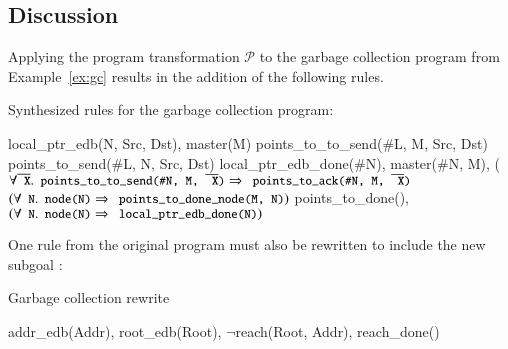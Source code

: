 

\subsection{Discussion}
Applying the program transformation $\mathcal{P}$ to the garbage collection program from Example~\ref{ex:gc} results in the addition of the following rules.

\begin{example}
Synthesized rules for the garbage collection program:

\begin{Drules}
        {local_ptr_edb(N, Src, Dst), master(M)}
        {points_to_to_send(#L, M, Src, Dst)}
        {points_to_send(#L, N, Src, Dst)}
        {local_ptr_edb_done(#N), master(#N, M), (\(\forall \od{X}.\dedalus{points_to_to_send(#N, M, \od{X})} \Rightarrow \dedalus{points_to_ack(#N, M, \od{X})}\)}
        {\(\left(\forall \dedalus{N}.\dedalus{node(N)} \Rightarrow \dedalus{points_to_done_node(M, N)}\right)\)}
        {points_to_done(), \(\left(\forall \dedalus{N}.\dedalus{node(N)} \Rightarrow \dedalus{local_ptr_edb_done(N)}\right)\)}
\end{Drules}
\end{example}

One rule from the original program must also be rewritten to include the
new subgoal :

\begin{example}
Garbage collection rewrite

\begin{Drules}
        {addr_edb(Addr), root_edb(Root), $\lnot$reach(Root, Addr), reach_done()}
\end{Drules}
\end{example}

